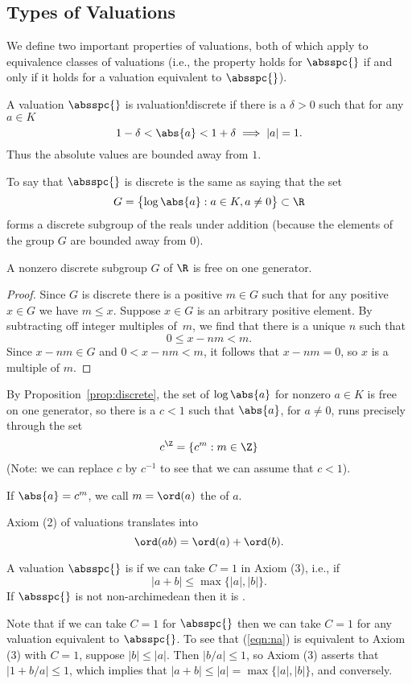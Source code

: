 \documentclass[11pt]{book}
\begin{document}
\begin{ch}
\section{Types of Valuations}
We define two important properties of valuations, both of which
apply to  equivalence classes of valuations (i.e., the property
holds for $\absspc{}$ if and only if it holds for a valuation
equivalent to $\absspc{}$).
\begin{definition}[Discrete]
A valuation $\absspc{}$ is \i{valuation!discrete}
if there is a $\delta>0$
such that for any $a\in K$
$$
   1-\delta < \abs{a} < 1+\delta \implies |a|=1.
$$
Thus the absolute values are bounded away from $1$.
\end{definition}
To say that $\absspc{}$ is discrete is the same as saying
that the set
$$G=\bigl\{
  \log\abs{a} : a \in K, a\neq 0
\bigr\} \subset \R
$$
forms a discrete subgroup of the reals under addition (because
the elements of the group $G$ are bounded away from $0$).
\begin{proposition}\label{prop:discrete}
A nonzero discrete subgroup $G$ of $\R$ is free on one generator.
\end{proposition}
\begin{proof}
Since $G$ is discrete there is a positive  $m\in G$
such that for any positive $x\in G$ we have $m\leq x$.
Suppose $x\in G$ is an arbitrary positive element.
By subtracting off integer multiples of~$m$, we
find that there is a unique $n$ such that
$$
   0\leq x-nm <m.
$$
Since $x-nm\in G$ and $0<x-nm<m$, it follows
that $x-nm=0$, so $x$ is a multiple of $m$.
\end{proof}
By Proposition~\ref{prop:discrete}, the set
of $\log\abs{a}$ for nonzero $a\in K$
is free on one generator, so there
is a $c<1$ such that $\abs{a}$, for $a\neq 0$,
runs precisely through the set $$c^\Z = \{c^m : m\in \Z\}$$
(Note: we can replace $c$ by $c^{-1}$ to see that we
can assume that $c<1$).

\begin{definition}[Order]
If $\abs{a} = c^m$, we call $m=\ord(a)$ the 
of $a$.
\end{definition}
Axiom (2) of valuations
translates into
$$
  \ord(ab) = \ord(a) + \ord(b).
$$

\begin{definition}
A valuation $\absspc{}$ is 
if we can take $C=1$ in Axiom (3), i.e., if
\begin{equation}\label{eqn:na}
   |a + b| \leq \max\bigl\{|a|,|b|\bigr\}.
\end{equation}
If $\absspc{}$ is not non-archimedean then
it is .
\end{definition}
Note that if we can take $C=1$ for $\absspc{}$
then we can take $C=1$ for any valuation equivalent to
$\absspc{}$.
To see that (\ref{eqn:na}) is equivalent to Axiom (3) with
$C=1$, suppose $|b|\leq |a|$.  Then $|b/a|\leq 1$, so
Axiom (3) asserts that $|1+b/a|\leq 1$, which implies
that $|a+b| \leq |a| = \max\{|a|,|b|\}$, and conversely.


\end{ch}
\end{document}
